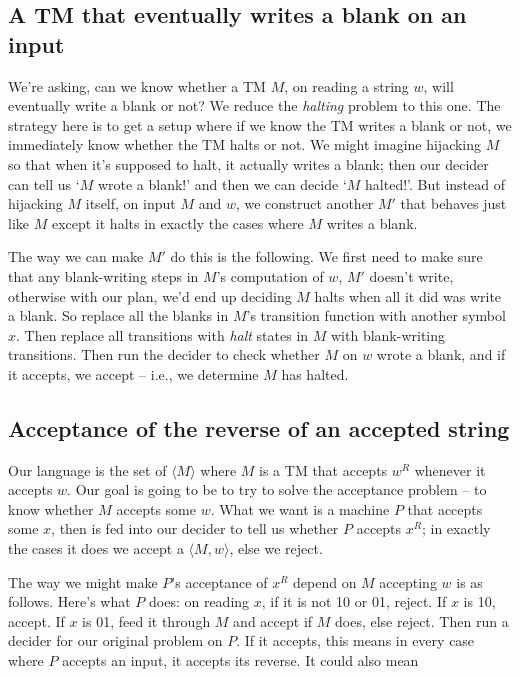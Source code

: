 \documentclass[11pt]{article}
\begin{document}
\subsection{A TM that eventually writes a blank on an input}
We're asking, can we know whether a TM $M$, on reading a string $w$, will eventually write a blank or not? We reduce the \emph{halting} problem to this one. The strategy here is to get a setup where if we know the TM writes a blank or not, we immediately know whether the TM halts or not. We might imagine hijacking $M$ so that when it's supposed to halt, it actually writes a blank; then our decider can tell us `$M$ wrote a blank!' and then we can decide `$M$ halted!'. But instead of hijacking $M$ itself, on input $M$ and $w$, we construct another $M'$ that behaves just like $M$ except it halts in exactly the cases where $M$ writes a blank. 

The way we can make $M'$ do this is the following. We first need to make sure that any blank-writing steps in $M$'s computation of $w$, $M'$ doesn't write, otherwise with our plan, we'd end up deciding $M$ halts when all it did was write a blank. So replace all the blanks in $M$'s transition function with another symbol $x$. Then replace all transitions with \emph{halt} states in $M$ with blank-writing transitions. Then run the decider to check whether $M$ on $w$ wrote a blank, and if it accepts, we accept -- i.e., we determine $M$ has halted.

\subsection{Acceptance of the reverse of an accepted string}
Our language is the set of $\langle M \rangle$ where $M$ is a TM that accepts $w^R$ whenever it accepts $w$. Our goal is going to be to try to solve the acceptance problem -- to know whether $M$ accepts some $w$. What we want is a machine $P$ that accepts some $x$, then is fed into our decider to tell us whether $P$ accepts $x^R$; in exactly the cases it does we accept a $\langle M, w \rangle$, else we reject. 

The way we might make $P$'s acceptance of $x^R$ depend on $M$ accepting $w$ is as follows. Here's what $P$ does: on reading $x$, if it is not 10 or 01, reject. If $x$ is 10, accept. If $x$ is 01, feed it through $M$ and accept if $M$ does, else reject. Then run a decider for our original problem on $P$. If it accepts, this means in every case where $P$ accepts an input, it accepts its reverse. It could also mean
\end{document}
